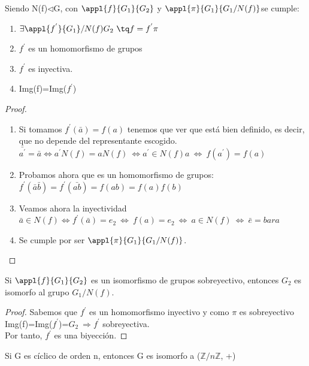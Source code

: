 \documentclass{apuntes}
\begin{document}
\begin{theorem}
 Siendo N(f)$\lhd$G, con $\appl{f}{G_1}{G_2}$ y $\appl{\pi}{G_1}{G_1/N(f)}$se cumple:
 \begin{enumerate}
  \item $\exists \appl{f^{'}}{G_1}/N(f){G_2} \ \tq f=f^{'}\pi$
  \item $f^{'}$  es un homomorfismo de grupos
  \item $f^{'}$  es inyectiva.
  \item Img(f)=Img($f^{'}$)
 \end{enumerate}
\end{theorem}
\begin{proof}
 \begin{enumerate}
  \item Si tomamos $f^{'}(\bar{a})=f(a)$  tenemos que ver que está bien definido, es decir, que no depende del representante escogido.\\
  $\bar{a^{'}}=\bar{a} \Leftrightarrow a^{'}N(f)=aN(f) \ \Leftrightarrow a^{'}\in N(f)a \ \Leftrightarrow \ f(a^{'})=f(a)$
  \item Probamos ahora que es un homomorfismo de grupos:\\
  $ f^{'}(\bar{a}\bar{b})=f^{'}(\bar{ab})=f(ab)=f(a)f(b)$
  \item Veamos ahora la inyectividad\\
  $\bar{a}\in N(f) \Leftrightarrow f^{'}(\bar{a})=e_2 \ \Leftrightarrow \ f(a)=e_2 \ \Leftrightarrow \ a\in N(f) \ \Leftrightarrow \ \bar{e}=bar{a}$
  \item Se cumple por ser $\appl{\pi}{G_1}{G_1/N(f)}$.
 \end{enumerate}
\end{proof}

\begin{theorem}
 Si $\appl{f}{G_1}{G_2}$  es un isomorfismo de grupos sobreyectivo, entonces $G_2$  es isomorfo al grupo $G_1/N(f)$.
\end{theorem}
\begin{proof}
 Sabemos que $f^{'}$  es un homomorfismo inyectivo y como $\pi$  es sobreyectivo Img(f)=Img($f^{'}$)=$G_2 \ \Rightarrow f^{'}$ sobreyectiva.\\
 Por tanto, $f^{'}$  es una biyección.
\end{proof}
\begin{corol}
 Si G es cíclico de orden n, entonces G es isomorfo a ($\mathbb{Z}/n\mathbb{Z}$, +)
\end{corol}
\end{document}
